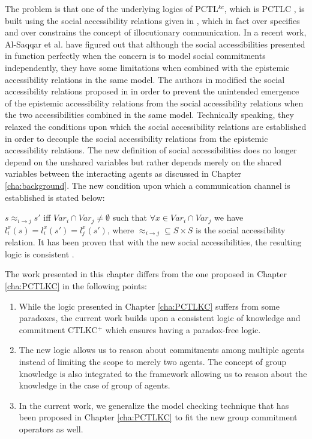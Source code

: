 The problem is that one of the underlying logics of PCTL$^{kc}$, which
is PCTLC \cite{Sultan2013}, is built using the social accessibility relations given in \cite{Bentahar2012,El-Menshawy2013a}, which in fact over specifies and over constrains the concept of illocutionary communication. In a recent work, Al-Saqqar et al. \cite{Al-Saqqar2014a} have figured out that although the social accessibilities presented in \cite{Bentahar2012,El-Menshawy2013a} function perfectly when the concern is to model social commitments independently, they have some limitations when combined with the epistemic accessibility relations in the same model. The authors in \cite{Al-Saqqar2014a} modified the social accessibility relations proposed in \cite{Bentahar2012,El-Menshawy2013a} in order to prevent the unintended emergence of the epistemic accessibility relations from the social accessibility relations when the two accessibilities combined in the same model. Technically speaking, they relaxed the conditions upon which the social accessibility relations are established in order to decouple the social accessibility relations from the epistemic accessibility relations. The new definition of social accessibilities does no longer depend on the unshared variables but rather depends merely on the shared variables between the interacting agents as discussed in Chapter \ref{cha:background}. The new condition upon which a communication channel is established is stated below:

 $ s \approx_{i \rightarrow j} s' $ iff $ Var_i \cap Var_j \neq \emptyset $ such that $ \forall x \in Var_i \cap Var_j $ we have $ l_i^x(s) =
l_i^x(s') = l_j^x(s')$, where $\approx_{i\rightarrow j} \subseteq S \times S$ is the social accessibility relation. It has been proven that with the new social accessibilities, the resulting logic is consistent \cite{Al-Saqqar2014a}.

The work presented in this chapter differs from the one proposed in Chapter \ref{cha:PCTLKC} in the following points:

\begin{enumerate}
\item While the logic presented in Chapter \ref{cha:PCTLKC} suffers from
some paradoxes, the current work builds upon a consistent logic of
knowledge and commitment CTLKC$^+$ \cite{Al-Saqqar2014a} which
ensures having a paradox-free logic.

\item The new logic allows us to reason about commitments among
multiple agents instead of limiting the scope to merely two
agents. The concept of group knowledge is also integrated to the framework allowing us to reason about the knowledge in the case of group of agents.

\item In the current work, we generalize the model checking
technique that has been proposed in Chapter \ref{cha:PCTLKC} to fit the new group commitment operators as well.
\end{enumerate}


